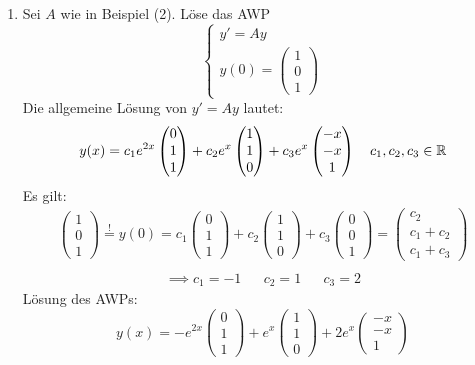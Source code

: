 \documentclass[a4paper,twoside,DIV15,BCOR12mm,chapterprefix=true,headings=twolinechapter]{scrbook}
\begin{document}
\begin{enumerate}
\item Sei $A$ wie in Beispiel (2). Löse das AWP \[\begin{cases}
y'=Ay\\
y(0) = \begin{pmatrix} 1 \\ 0 \\ 1 \end{pmatrix}
\end{cases}\]
Die allgemeine Lösung von $y' = Ay$ lautet: 
\[ y(x) = c_1  e^{2x}\begin{pmatrix} 0 \\ 1\\1 \end{pmatrix} 
+ c_2  e^x \begin{pmatrix} 1\\1\\0 \end{pmatrix} 
+ c_3 e^x \begin{pmatrix} -x \\ -x \\ 1 \end{pmatrix}\quad c_1, c_2, c_3 \in \mathbb{R} \]
Es gilt:
\begin{align*}
\begin{pmatrix} 1 \\ 0 \\ 1 \end{pmatrix} \stackrel!= y(0) 
= c_1  \begin{pmatrix} 0 \\ 1\\1 \end{pmatrix} 
+ c_2   \begin{pmatrix} 1\\1\\0 \end{pmatrix} 
+ c_3  \begin{pmatrix} 0 \\ 0 \\ 1 \end{pmatrix} 
= \begin{pmatrix} c_2 \\ c_1+c_2\\c_1+c_3 \end{pmatrix}\\
\end{align*}
\begin{align*}
\implies c_1=-1 &&c_2 = 1 && c_3 = 2
\end{align*}
Lösung des AWPs: 
\[y(x) = -e^{2x}\begin{pmatrix} 0 \\ 1\\1 \end{pmatrix} 
+ e^x \begin{pmatrix} 1\\1\\0 \end{pmatrix} 
+ 2e^x \begin{pmatrix} -x \\ -x \\ 1 \end{pmatrix}\]


\end{enumerate}
\end{document}
